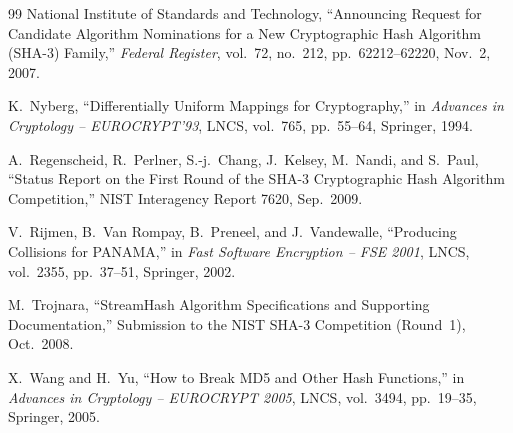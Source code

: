 \documentclass[11pt,a4paper]{article}
\theoremstyle{definition}
\theoremstyle{remark}
\begin{document}
\begin{thebibliography}{99}
National Institute of Standards and Technology,
``Announcing Request for Candidate Algorithm Nominations for a New Cryptographic Hash Algorithm (SHA-3) Family,'' \emph{Federal Register}, vol.~72, no.~212, pp.~62212--62220, Nov.~2, 2007.

K.~Nyberg,
``Differentially Uniform Mappings for Cryptography,'' in \emph{Advances in Cryptology -- EUROCRYPT'93}, LNCS, vol.~765, pp.~55--64, Springer, 1994.

A.~Regenscheid, R.~Perlner, S.-j.~Chang, J.~Kelsey, M.~Nandi, and S.~Paul,
``Status Report on the First Round of the SHA-3 Cryptographic Hash Algorithm Competition,'' NIST Interagency Report 7620, Sep.~2009.

V.~Rijmen, B.~Van Rompay, B.~Preneel, and J.~Vandewalle,
``Producing Collisions for PANAMA,'' in \emph{Fast Software Encryption -- FSE 2001}, LNCS, vol.~2355, pp.~37--51, Springer, 2002.

M.~Trojnara,
``StreamHash Algorithm Specifications and Supporting Documentation,'' Submission to the NIST SHA-3 Competition (Round~1), Oct.~2008.

X.~Wang and H.~Yu,
``How to Break MD5 and Other Hash Functions,'' in \emph{Advances in Cryptology -- EUROCRYPT 2005}, LNCS, vol.~3494, pp.~19--35, Springer, 2005.

\end{thebibliography}
\end{document}
